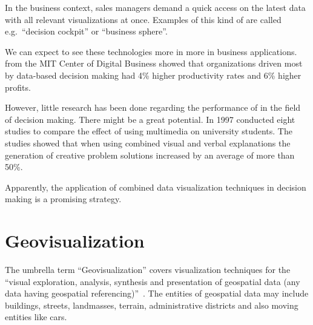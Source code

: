 In the business context, sales managers demand a quick access on the latest data with all relevant visualizations at once.
Examples of this kind of \dss{} are called e.g.\ ``decision cockpit'' or ``business sphere''\cite{Davenport2013}.

We can expect to see these technologies more in more in business applications.
\textcite{McAfee2012} from the MIT Center of Digital Business showed that organizations driven most by data-based decision making had 4\% higher productivity rates and 6\% higher profits.

However, little research has been done regarding the performance of \cmvs{} in the field of decision making.
There might be a great potential.
In 1997 \textcite{Mayer1997} conducted eight studies to compare the effect of using multimedia on university students.
The studies showed that when using combined visual and verbal explanations the generation of creative problem solutions increased by an average of more than 50\%.

Apparently, the application of combined data visualization techniques in decision making is a promising strategy.


\section{Geovisualization}
The umbrella term ``Geovisualization'' covers visualization techniques for the ``visual exploration, analysis, synthesis and presentation of geospatial data (any data having geospatial  referencing)''~\cite{Maceachren2001}.
The entities of geospatial data may include buildings, streets, landmasses, terrain, administrative districts and also moving entities like cars.


